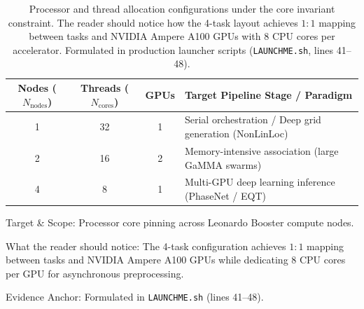 \begin{table}[htbp]
  \centering
  \small
  \caption{Processor and thread allocation configurations under the
    core invariant constraint. The reader should notice how the
    \num{4}-task layout
    achieves $\num{1}:\num{1}$ mapping between tasks and NVIDIA Ampere A100
    \acp{GPU} with \num{8}
    \ac{CPU} cores per accelerator.
    Formulated in production launcher scripts (\texttt{LAUNCHME.sh},
  lines 41--48).}
  \label{tab:thread_allocation}
  \begin{threeparttable}
    \begin{tabularx}{\linewidth}{c c c >{\raggedright\arraybackslash}X}
      \toprule
      \textbf{Nodes} ($N_{\mathrm{nodes}}$) &
      \textbf{Threads} ($N_{\mathrm{cores}}$) &
      \textbf{\acp{GPU}} & \textbf{Target Pipeline Stage / Paradigm} \\
      \midrule
      \num{1} & \num{32} & \num{1} & Serial orchestration / Deep
      grid generation (\ac{NonLinLoc}) \\
      \num{2} & \num{16} & \num{2} & Memory-intensive association
      (large \ac{GaMMA} swarms) \\
      \num{4} & \num{8}  & \num{1} & Multi-\ac{GPU} deep learning
      inference (\ac{PhaseNet} / \ac{EQT}) \\
      \bottomrule
    \end{tabularx}
    \begin{tablenotes}[flushleft]
      \footnotesize
    \item Target \& Scope: Processor core pinning across Leonardo
      Booster compute nodes.
    \item What the reader should notice: The \num{4}-task configuration
      achieves $\num{1}:\num{1}$ mapping between tasks and NVIDIA
      Ampere A100 \acp{GPU} while
      dedicating \num{8} \ac{CPU} cores per \ac{GPU} for
      asynchronous preprocessing.
    \item Evidence Anchor: Formulated in \texttt{LAUNCHME.sh} (lines 41--48).
    \end{tablenotes}
  \end{threeparttable}
\end{table}

